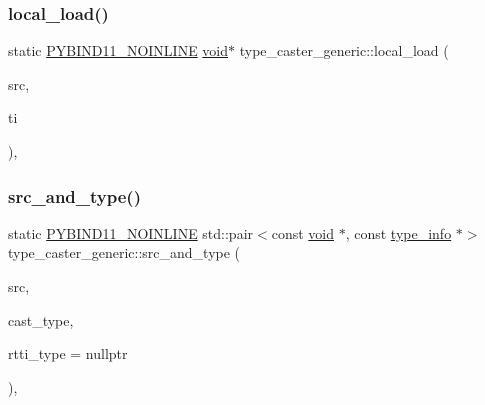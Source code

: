 \subsubsection{\texorpdfstring{local\_load()}{local\_load()}}
{\footnotesize\ttfamily static \mbox{\hyperlink{detail_2common_8h_a1fb186b7494d5c576d902c0730ecbb71}{P\+Y\+B\+I\+N\+D11\+\_\+\+N\+O\+I\+N\+L\+I\+NE}} \mbox{\hyperlink{_s_d_l__opengles2__gl2ext_8h_ae5d8fa23ad07c48bb609509eae494c95}{void}}$\ast$ type\+\_\+caster\+\_\+generic\+::local\+\_\+load (\begin{DoxyParamCaption}\item[{\mbox{\hyperlink{_python27_2object_8h_aadc84ac7aed2cfa6f20c25f62bf3dac7}{Py\+Object}} $\ast$}]{src,  }\item[{const \mbox{\hyperlink{structtype__info}{type\+\_\+info}} $\ast$}]{ti }\end{DoxyParamCaption})\hspace{0.3cm}{\ttfamily [inline]}, {\ttfamily [static]}}

\mbox{\label{classtype__caster__generic_a2f47b7a5edcbc5d26abfb7807baf5139}} 
\subsubsection{\texorpdfstring{src\_and\_type()}{src\_and\_type()}}
{\footnotesize\ttfamily static \mbox{\hyperlink{detail_2common_8h_a1fb186b7494d5c576d902c0730ecbb71}{P\+Y\+B\+I\+N\+D11\+\_\+\+N\+O\+I\+N\+L\+I\+NE}} std\+::pair$<$const \mbox{\hyperlink{_s_d_l__opengles2__gl2ext_8h_ae5d8fa23ad07c48bb609509eae494c95}{void}} $\ast$, const \mbox{\hyperlink{structtype__info}{type\+\_\+info}} $\ast$$>$ type\+\_\+caster\+\_\+generic\+::src\+\_\+and\+\_\+type (\begin{DoxyParamCaption}\item[{const \mbox{\hyperlink{_s_d_l__opengles2__gl2ext_8h_ae5d8fa23ad07c48bb609509eae494c95}{void}} $\ast$}]{src,  }\item[{const std\+::type\+\_\+info \&}]{cast\+\_\+type,  }\item[{const std\+::type\+\_\+info $\ast$}]{rtti\+\_\+type = {\ttfamily nullptr} }\end{DoxyParamCaption})\hspace{0.3cm}{\ttfamily [inline]}, {\ttfamily [static]}}

